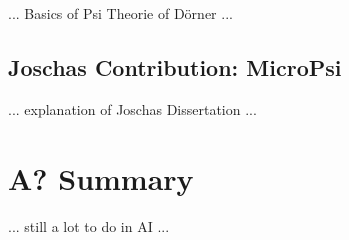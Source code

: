 ... Basics of Psi Theorie of Dörner ...

\subsection{Joschas Contribution: MicroPsi}
... explanation of Joschas Dissertation ...

\section{A? Summary}
... still a lot to do in AI ...